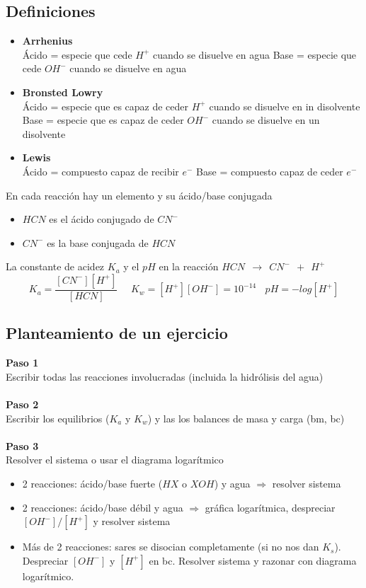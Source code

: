 \documentclass[12pt]{article}
\begin{document}
	\subsection{Definiciones}
	\begin{itemize}
		\item \textbf{Arrhenius} \\
		Ácido = especie que cede $H^+$ cuando se disuelve en agua
		Base = especie que cede $OH^-$ cuando se disuelve en agua
		\item \textbf{Bronsted Lowry} \\
		Ácido = especie que es capaz de ceder $H^+$ cuando se disuelve en in disolvente
		Base = especie que es capaz de ceder $OH^-$ cuando se disuelve en un disolvente
		\item \textbf{Lewis}\\
		Ácido = compuesto capaz de recibir $e^-$
		Base = compuesto capaz de ceder $e^-$ 
	\end{itemize} 
	
	En cada reacción hay un elemento y su ácido/base conjugada
	\begin{itemize}
		\item $HCN$ es el ácido conjugado de $CN^-$
		\item $CN^-$ es la base conjugada de $HCN$
	\end{itemize}
	La constante de acidez $K_a$ y el $pH$ en la reacción $HCN \ \ \to \ \ CN^-\ \ + \ \ H^+$
	\[K_a=\frac{[CN^-][H^+]}{[HCN]} \ \ \ \ \ \ K_w=[H^+][OH^-]=10^{-14} \ \ \ \ pH=-log[H^+]\]
	
	\subsection{Planteamiento de un ejercicio}
	\textbf{Paso 1}\\
	Escribir todas las reacciones involucradas (incluida la hidrólisis del agua)\\
	\\
	\textbf{Paso 2}\\
	Escribir los equilibrios ($K_a$ y $K_w$) y las los balances de masa y carga (bm, bc)\\
	\\
	\textbf{Paso 3}\\
	Resolver el sistema o usar el diagrama logarítmico
	\begin{itemize}
		\item 2 reacciones: ácido/base fuerte ($HX$ o $XOH$) y agua $\Rightarrow$ resolver sistema
		\item 2 reacciones: ácido/base débil y agua $\Rightarrow$ gráfica logarítmica, despreciar $[OH^-]/[H^+]$ y resolver sistema
		\item Más de 2 reacciones: sares se disocian completamente (si no nos dan $K_s$). Despreciar $[OH^-]$ y $[H^+]$ en bc. Resolver sistema y razonar con diagrama logarítmico.
	\end{itemize}
	
\end{document}
